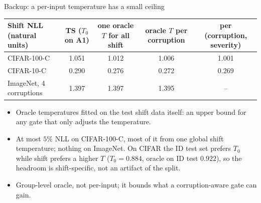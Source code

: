 \documentclass[aspectratio=169,11pt]{beamer}
\begin{document}
\begin{frame}{Backup: a per-input temperature has a small ceiling}
  \small
  \centering
  \begin{tabular}{@{}lcccc@{}}
    \toprule
    Shift NLL (natural units) & TS ($T_0$ on A1) & one oracle $T$ for all shift & oracle $T$ per corruption & per (corruption, severity)\\
    \midrule
    CIFAR-100-C & 1.051 & 1.012 & 1.006 & 1.001\\
    CIFAR-10-C & 0.290 & 0.276 & 0.272 & 0.269\\
    ImageNet, 4 corruptions & 1.397 & 1.397 & 1.395 & --\\
    \bottomrule
  \end{tabular}
  \par\medskip\raggedright
  \begin{itemize}
    \item Oracle temperatures fitted on the test shift data itself: an upper bound for any gate that only adjusts the temperature.
    \item At most $5\%$ NLL on CIFAR-100-C, most of it from one global shift temperature; nothing on ImageNet. On CIFAR the ID test set prefers $T_0$ while shift prefers a higher $T$ ($T_0=0.884$, oracle on ID test $0.922$), so the headroom is shift-specific, not an artifact of the split.
    \item Group-level oracle, not per-input; it bounds what a corruption-aware gate can gain.
  \end{itemize}
\end{frame}
\end{document}
